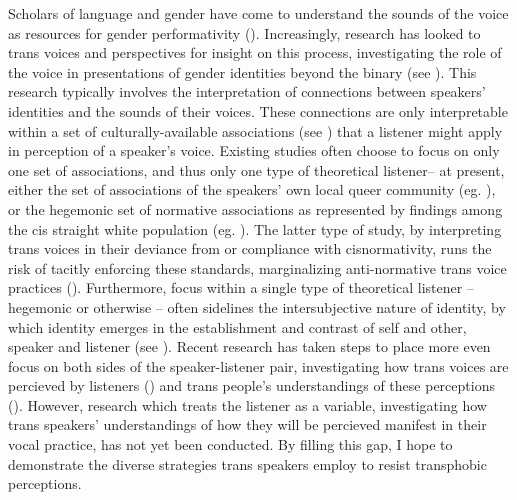 \documentclass[11pt]{article}
\begin{document}
Scholars of language and gender have come to understand the sounds of the voice as resources for gender performativity (\cite{bucholtz_feminist_2014}). Increasingly, research has looked to trans voices and perspectives for insight on this process, investigating the role of the voice in presentations of gender identities beyond the binary (see \cite{zimman_transgender_2020}). This research typically involves the interpretation of connections between speakers' identities and the sounds of their voices. These connections are only interpretable within a set of culturally-available associations (see \cite{calder_whose_2021}) that a listener might apply in perception of a speaker's voice. Existing studies often choose to focus on only one set of associations, and thus only one type of theoretical listener-- at present, either the set of associations of the speakers' own local queer community (eg. \cite{calder_sissy_2019}), or the hegemonic set of normative associations as represented by findings among the cis straight white population (eg. \cite{hazenberg_language_2012, podesva_sexuality_2015}). The latter type of study, by interpreting trans voices in their deviance from or compliance with cisnormativity, runs the risk of tacitly enforcing these standards, marginalizing anti-normative trans voice practices (\cite{calder_interrogating_2025}). Furthermore, focus within a single type of theoretical listener -- hegemonic or otherwise -- often sidelines the intersubjective nature of identity, by which identity emerges in the establishment and contrast of self and other, speaker and listener (see \cite{bucholtz_locating_2010}). Recent research has taken steps to place more even focus on both sides of the speaker-listener pair, investigating how trans voices are percieved by listeners (\cite{jessee_cisgender_2025}) and trans people's understandings of these perceptions (\cite{heffernan_constructing_2023}). However, research which treats the listener as a variable, investigating how trans speakers' understandings of how they will be percieved manifest in their vocal practice, has not yet been conducted. By filling this gap, I hope to demonstrate the diverse strategies trans speakers employ to resist transphobic perceptions.
\end{document}
